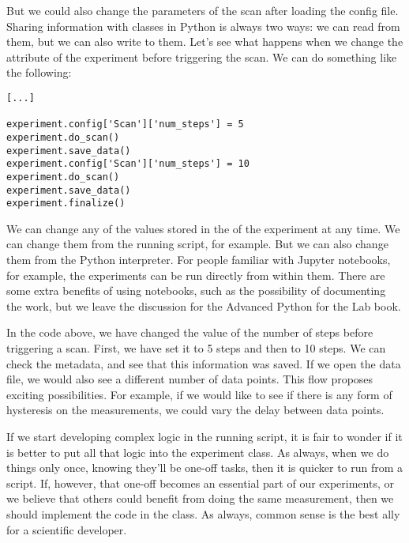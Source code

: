 But we could also change the parameters of the scan after loading the config file. Sharing information with classes in Python is always two ways: we can read from them, but we can also write to them. Let's see what happens when we change the  attribute of the experiment before triggering the scan. We can do something like the following:

\begin{verbatim}
[...]

experiment.config['Scan']['num_steps'] = 5
experiment.do_scan()
experiment.save_data()
experiment.config['Scan']['num_steps'] = 10
experiment.do_scan()
experiment.save_data()
experiment.finalize()
\end{verbatim}

We can change any of the values stored in the  of the experiment at any time. We can change them from the running script, for example. But we can also change them from the Python interpreter. For people familiar with Jupyter notebooks, for example, the experiments can be run directly from within them. There are some extra benefits of using notebooks, such as the possibility of documenting the work, but we leave the discussion for the Advanced Python for the Lab book.


In the code above, we have changed the value of the number of steps before triggering a scan. First, we have set it to 5 steps and then to 10 steps. We can check the metadata, and see that this information was saved. If we open the data file, we would also see a different number of data points. This flow proposes exciting possibilities. For example, if we would like to see if there is any form of hysteresis on the measurements, we could vary the delay between data points.


If we start developing complex logic in the running script, it is fair to wonder if it is better to put all that logic into the experiment class. As always, when we do things only once, knowing they'll be one-off tasks, then it is quicker to run from a script. If, however, that one-off becomes an essential part of our experiments, or we believe that others could benefit from doing the same measurement, then we should implement the code in the class. As always, common sense is the best ally for a scientific developer.

